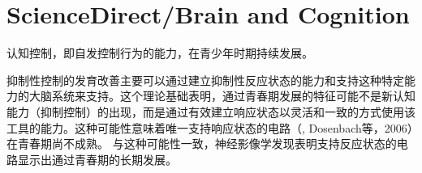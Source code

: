 \section*{ ScienceDirect/Brain and Cognition \cite{}}
认知控制，即自发控制行为的能力，在青少年时期持续发展。

抑制性控制的发育改善主要可以通过建立抑制性反应状态的能力和支持这种特定能力的大脑系统来支持。这个理论基础表明，通过青春期发展的特征可能不是新认知能力（抑制控制）的出现，而是通过有效建立响应状态以灵活和一致的方式使用该工具的能力。这种可能性意味着唯一支持响应状态的电路（\cite{}, Dosenbach等，2006）在青春期尚不成熟。 与这种可能性一致，神经影像学发现表明支持反应状态的电路显示出通过青春期的长期发展。

